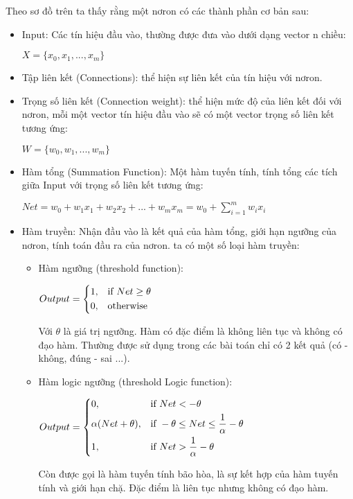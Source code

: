 \documentclass[13pt, a4paper]{extreport}
\begin{document}
Theo sơ đồ trên ta thấy rằng một nơron có các thành phần cơ bản sau:
\begin{itemize}
\item Input: Các tín hiệu đầu vào, thường được đưa vào dưới dạng vector n chiều:\\
	\centerline {$X = \{x_0, x_1, ..., x_m\}$}
\item Tập liên kết (Connections): thể hiện sự liên kết của tín hiệu với nơron.
\item Trọng số liên kết (Connection weight): thể hiện mức độ của liên kết đối với nơron, mỗi một vector tín hiệu đầu vào sẽ có một vector trọng số liên kết tương ứng:\\
	\centerline {$W = \{w_0, w_1, ..., w_m\}$}
\item Hàm tổng (Summation Function): Một hàm tuyến tính, tính tổng các tích giữa Input với trọng số liên kết tương ứng:\\
	\centerline {$Net = w_0 + w_1x_1 + w_2x_2 + ... + w_mx_m = w_0 + \sum\limits_{i=1}^m w_ix_i$}
\item Hàm truyền: Nhận đầu vào là kết quả của hàm tổng, giới hạn ngưỡng của nơron, tính toán đầu ra của nơron. ta có một số loại hàm truyền:
	\begin{itemize}
		\item Hàm ngưỡng (threshold function):
		  \begin{center}
			$Output = \begin{dcases} 1, & \text{if } Net \geq \theta\\ 0, & \text{otherwise} \end{dcases}$
		  \end{center}	
		Với $\theta$ là giá trị ngưỡng. Hàm có đặc điểm là không liên tục và không có đạo hàm. Thường được sử dụng trong các bài toán chỉ có 2 kết quả (có - không, đúng - sai ...).
		\item Hàm logic ngưỡng (threshold Logic function):
     	  \begin{center}
			$Output = 
				\begin{dcases} 
					0, & \text{if } Net < -\theta \\
					\alpha(Net + \theta), & \text{if } -\theta \leq Net \leq \frac{1}{\alpha}-\theta\\
					1, & \text{if } Net > \frac{1}{\alpha}-\theta
				\end{dcases}$
		  \end{center}
		  Còn được gọi là  hàm tuyến tính bão hòa, là sự kết hợp của hàm tuyến tính và giới hạn chặ. Đặc điểm là liên tục nhưng không có đạo hàm.

\end{itemize}
\end{itemize}
\end{document}
